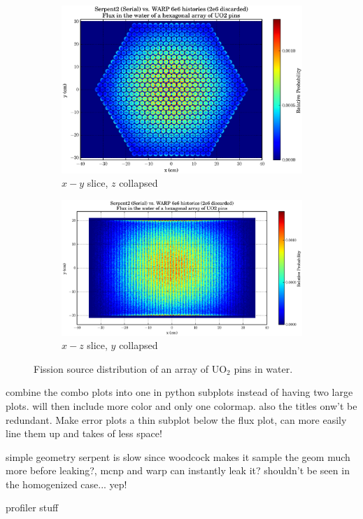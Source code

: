 \begin{figure}[h!]
\centering
\begin{subfigure}{.5\textwidth}
  \centering
  \includegraphics[width=\linewidth]{graphics/finalresults/assembly_fiss1.eps}
  \caption{$x-y$ slice, $z$ collapsed}
  \label{fig:sub1}
\end{subfigure}%
\begin{subfigure}{.5\textwidth}
  \centering
  \includegraphics[width=\linewidth]{graphics/finalresults/assembly_fiss2.eps}
  \caption{$x-z$ slice, $y$ collapsed}
  \label{fig:sub2}
\end{subfigure}
\caption{Fission source distribution of an array of UO$_2$ pins in water. \label{assembly_fiss} }
\end{figure}

combine the combo plots into one in python subplots instead of having two large plots.  will then include more color and only one colormap.  also the titles onw't be redundant.  Make error plots a thin subplot below the flux plot, can more easily line them up and takes of less space!

simple geometry serpent is slow since woodcock makes it sample the geom much more before leaking?, mcnp and warp can instantly leak it?  shouldn't be seen in the homogenized case... yep!


profiler stuff

